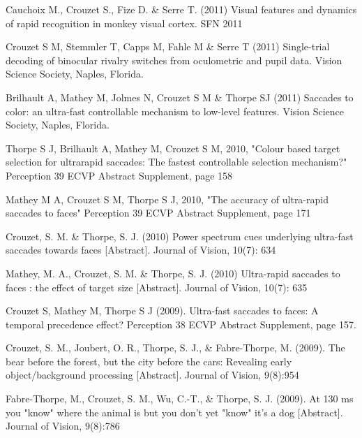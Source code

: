 \documentclass[margin,line]{resume}
\begin{document}
\begin{resume}
\vspace{-2mm} Cauchoix M., Crouzet S., Fize D. \& Serre T. (2011) Visual features and dynamics of rapid recognition in monkey visual cortex. SFN 2011

\vspace{-2mm} Crouzet S M, Stemmler T, Capps M, Fahle M \& Serre T (2011) Single-trial decoding of binocular rivalry switches from oculometric and pupil data. Vision Science Society, Naples, Florida.

\vspace{-2mm} Brilhault A, Mathey M, Jolmes N, Crouzet S M \& Thorpe SJ (2011) Saccades to color: an ultra-fast controllable mechanism to low-level features. Vision Science Society, Naples, Florida.

\vspace{-2mm} Thorpe S J, Brilhault A, Mathey M, Crouzet S M, 2010, "Colour based target selection for ultrarapid saccades: The fastest controllable selection mechanism?" Perception 39 ECVP Abstract Supplement, page 158

\vspace{-2mm} Mathey M A, Crouzet S M, Thorpe S J, 2010, "The accuracy of ultra-rapid saccades to faces" Perception 39 ECVP Abstract Supplement, page 171

\vspace{-2mm} Crouzet, S. M. \& Thorpe, S. J. (2010) Power spectrum cues underlying ultra-fast saccades towards faces [Abstract]. Journal of Vision, 10(7): 634

\vspace{-2mm} Mathey, M. A., Crouzet, S. M. \& Thorpe, S. J. (2010) Ultra-rapid saccades to faces : the effect of target size [Abstract]. Journal of Vision, 10(7): 635

\vspace{-2mm} Crouzet S, Mathey M, Thorpe S J (2009). Ultra-fast saccades to faces: A temporal precedence effect? Perception 38 ECVP Abstract Supplement, page 157.

\vspace{-2mm} Crouzet, S. M., Joubert, O. R., Thorpe, S. J., \& Fabre-Thorpe, M. (2009). The bear before the forest, but the city before the cars: Revealing early object/background processing [Abstract]. Journal of Vision, 9(8):954

\newpage

\vspace{-2mm} Fabre-Thorpe, M., Crouzet, S. M., Wu, C.-T., \& Thorpe, S. J. (2009). At 130 ms you "know" where the animal is but you don't yet "know" it's a dog [Abstract]. Journal of Vision, 9(8):786


\end{resume}
\end{document}
